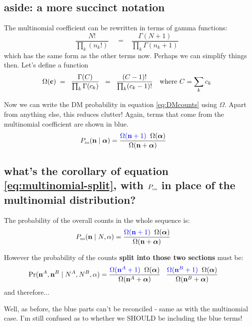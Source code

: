 \documentclass[12pt]{article}
\begin{document}
\subsection{aside: a more succinct notation}

The multinomial coefficient can be rewritten in terms of gamma functions:
\[
\frac{N!}{\prod_k (n_k!)} \;
\;\;\; = \;\;\; 
\frac{\Gamma(N+1)}{\prod_k \Gamma(n_k+1)}
\]
which has the same form as the other terms now.
Perhaps we can simplify things then. Let's define a function
\begin{align}
  \label{eq:omega}
 \Omega(\mathbf{c}) \;&= \;\;\frac{\Gamma(C)}{\prod_k \Gamma(c_k)} \;\;=\;\; \frac{(C-1)!}{\prod_k (c_k-1)! } & \text{where $C=\sum_k c_k$}
\end{align}

Now we can write the DM probability in equation \ref{eq:DMcounts}
using $\Omega$. Apart from anything else, this reduces clutter!
Again, terms that come from the multinomial coefficient are shown in
{\color{blue}blue}.
\begin{align}
P_\text{\tiny\sc dm}(\mathbf{n} \mid\boldsymbol\alpha) &= 
\frac{{\color{blue}\Omega(\mathbf{n}+1)} \;\; \Omega(\boldsymbol\alpha)}{ \Omega(\mathbf{n} + \boldsymbol\alpha)}
\label{eq:DMcounts_inOmega}
\end{align}


\subsection{what's the corollary of equation \ref{eq:multinomial-split}, with $P_\text{\tiny\sc dm}$ in place of the multinomial distribution?}

The probability of the overall counts in the whole sequence is:
\begin{align*}
P_\text{\tiny\sc dm}(\mathbf{n} \mid N,\alpha) &=  \frac{{\color{blue}\Omega(\mathbf{n}+1)} \;\; \Omega(\boldsymbol\alpha)}{ \Omega(\mathbf{n} + \boldsymbol\alpha)}
\end{align*}

However the probability of the counts {\bf split into those two sections} must be:
\begin{align*}
  \Pr(\mathbf{n}^A, \mathbf{n}^B\mid N^A,N^B,\alpha) &=  
\frac{{\color{blue}\Omega(\mathbf{n}^A+1)} \;\; \Omega(\boldsymbol\alpha)}{ \Omega(\mathbf{n}^A + \boldsymbol\alpha)}
\;\;\; \frac{{\color{blue}\Omega(\mathbf{n}^B+1)} \;\; \Omega(\boldsymbol\alpha)}{ \Omega(\mathbf{n}^B + \boldsymbol\alpha)}
\end{align*}
and therefore...


Well, {\color{red} as before, the {\color{blue}blue} parts can't be
  reconciled - same as with the multinomial case. I'm still confused
  as to whether we SHOULD be including the blue terms!}
\end{document}
